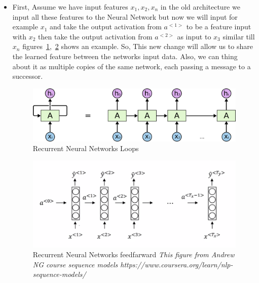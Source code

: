 \begin{itemize}
\item First, Assume we have input features $x_1, x_2, x_n$ in the old architecture we input all these features to the Neural Network but now we will input for example $x_1$ and take the output activation from $a^{<1>}$ to be a feature input with $x_2$ then take the output activation from $a^{<2>}$ as input to $x_3$ similar till $x_n$ figures~\ref{fig:RNN-rolled-loop.png},~\ref{fig:andew_ng_feedfarward} shows an example. So, This new change will allow us to share the learned feature between the networks input data. Also, we can thing about it as multiple copies of the same network, each passing a message to a successor\cite{colah}.

   \begin{figure}[ht!] \includegraphics[width=\linewidth]{./Figures/Ch_2_Background/RNN-unrolled.png}
  \caption{Recurrent Neural Networks Loops\cite{colah}}
  \label{fig:RNN-rolled-loop.png}
\end{figure}

\begin{figure}[ht!] \includegraphics[width=\linewidth]{./Figures/Ch_2_Background/andew_ng_feedfarward.png}
  \caption{Recurrent Neural Networks feedfarward \textit{ This figure from Andrew NG course sequence models https://www.coursera.org/learn/nlp-sequence-models/ }}
  \label{fig:andew_ng_feedfarward}
\end{figure}



\end{itemize}

